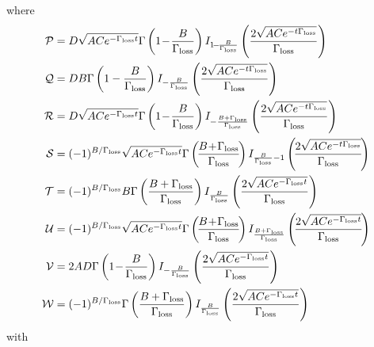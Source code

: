 where 
\begin{align}
\mathcal{P} &= D\sqrt{ACe^{-\Gamma_{\rm loss}  t}} \Gamma \left(1\!-\!\frac{B}{\Gamma_{\rm loss} }\right) I_{1\!-\!\frac{B}{\Gamma_{\rm loss} }}\left(\frac{2 \sqrt{ACe^{-t \Gamma_{\rm loss} }}}{\Gamma_{\rm loss} }\right)\\
\mathcal{Q} &= D B \Gamma \left(1-\frac{B}{\Gamma_{\rm loss} }\right) I_{-\frac{B}{\Gamma_{\rm loss} }}\left(\frac{2 \sqrt{AC e^{-t \Gamma_{\rm loss} }}}{\Gamma_{\rm loss} }\right)\\
\mathcal{R} &= D \sqrt{ACe^{-\Gamma_{\rm loss} t}} \Gamma \left(1\!-\!\frac{B}{\Gamma_{\rm loss} }\right) I_{-\frac{B+\Gamma_{\rm loss} }{\Gamma_{\rm loss} }}\left(\frac{2 \sqrt{AC e^{-t \Gamma_{\rm loss} }}}{\Gamma_{\rm loss} }\right)\\
\mathcal{S} &= (-1)^{B/\Gamma_{\rm loss} } \sqrt{AC e^{-\Gamma_{\rm loss} t}} \Gamma \left(\!\frac{B\!+\!\Gamma_{\rm loss} }{\Gamma_{\rm loss} }\!\right) I_{\frac{B}{\Gamma_{\rm loss} }-1}\left(\!\frac{2 \sqrt{AC e^{-t \Gamma_{\rm loss} }}}{\Gamma_{\rm loss} }\!\right)\\
\mathcal{T} &= (-1)^{B/\Gamma_{\rm loss} }B \Gamma \left(\frac{B+\Gamma_{\rm loss} }{\Gamma_{\rm loss} }\right) I_{\frac{B}{\Gamma_{\rm loss} }}\left(\frac{2 \sqrt{AC e^{-\Gamma_{\rm loss} t}}}{\Gamma_{\rm loss} }\right)\\
\mathcal{U} &= (-1)^{B/\Gamma_{\rm loss} } \sqrt{AC e^{-\Gamma_{\rm loss}  t}} \Gamma \left(\!\frac{B\!+\!\Gamma_{\rm loss} }{\Gamma_{\rm loss} }\!\right) I_{\frac{B+\Gamma_{\rm loss} }{\Gamma_{\rm loss} }}\left(\!\frac{2 \sqrt{AC e^{- \Gamma_{\rm loss}t }}}{\Gamma_{\rm loss} }\!\right)\\
\mathcal{V} &= 2 A D \Gamma \left(1\!-\!\frac{B}{\Gamma_{\rm loss} }\right) I_{-\frac{B}{\Gamma_{\rm loss} }}\left(\frac{2 \sqrt{AC e^{-\Gamma_{\rm loss}t }}}{\Gamma_{\rm loss} }\right)\\
\mathcal{W} &= (-1)^{B/\Gamma_{\rm loss} } \Gamma \left(\frac{B+\Gamma_{\rm loss} }{\Gamma_{\rm loss} }\right) I_{\frac{B}{\Gamma_{\rm loss} }}\left(\frac{2 \sqrt{AC e^{-\Gamma_{\rm loss}t }}}{\Gamma_{\rm loss} }\right)
\end{align}
with 
